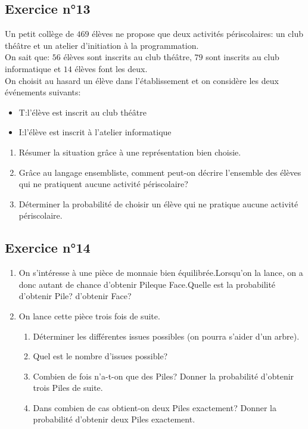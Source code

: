\documentclass[12pt,a4paper]{article}
\begin{document}
\subsection*{Exercice n°13}

Un petit collège de $469$ élèves ne propose que deux activités périscolaires:  un club théâtre et un atelier d’initiation à la programmation.\\
On sait que: $56$ élèves sont inscrits au club théâtre, $79$ sont inscrits au club informatique et $14$ élèves font les deux.\\
On choisit au hasard un élève dans l’établissement et on considère les deux événements suivants: 

\begin{itemize}
    \item T:\og l’élève est inscrit au club théâtre \fg
    \item I:\og l’élève est inscrit à l'atelier informatique \fg
\end{itemize}


\begin{enumerate}
    \item Résumer la situation grâce à une représentation bien choisie.
    \item Grâce au langage ensembliste, comment peut-on décrire l’ensemble des élèves qui ne pratiquent aucune activité périscolaire? 
    \item Déterminer la probabilité de choisir un élève qui ne pratique aucune activité périscolaire.
\end{enumerate}

\subsection*{Exercice n°14}

\begin{enumerate}
    \item On s’intéresse à une pièce de monnaie bien équilibrée.Lorsqu’on la lance, on a donc autant de chance d’obtenir Pileque Face.Quelle est la probabilité d’obtenir Pile? d’obtenir Face?
    \item On lance cette pièce trois fois de suite.
    \begin{enumerate}
        \item Déterminer les différentes issues possibles (on pourra s’aider d’un arbre).
        \item Quel est le nombre d’issues possible?
        \item Combien de fois n’a-t-on que des Piles? Donner la probabilité d’obtenir trois Piles de suite.
        \item Dans combien de cas obtient-on deux Piles exactement? Donner la probabilité d’obtenir deux Piles exactement.
    \end{enumerate}
\end{enumerate}
\end{document}

